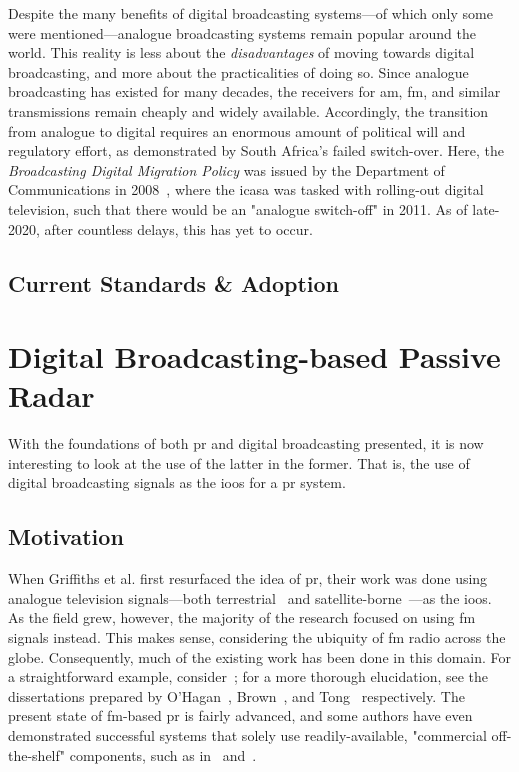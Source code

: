 \documentclass[class=report,11pt,crop=false]{standalone}
\begin{document}
Despite the many benefits of digital broadcasting systems---of which only some were mentioned---analogue broadcasting systems remain popular around the world. This reality is less about the \emph{disadvantages} of moving towards digital broadcasting, and more about the practicalities of doing so. Since analogue broadcasting has existed for many decades, the receivers for \gls{am}, \gls{fm}, and similar transmissions remain cheaply and widely available. Accordingly, the transition from analogue to digital requires an enormous amount of political will and regulatory effort, as demonstrated by South Africa's failed switch-over. Here, the \emph{Broadcasting Digital Migration Policy} was issued by the Department of Communications in 2008~\cite{icasaNotice2008}, where the \gls{icasa} was tasked with rolling-out digital television, such that there would be an "analogue switch-off" in 2011. As of late-2020, after countless delays, this has yet to occur.

\subsection{Current Standards \& Adoption}

\section{Digital Broadcasting-based Passive Radar}
With the foundations of both \gls{pr} and digital broadcasting presented, it is now interesting to look at the use of the latter in the former. That is, the use of digital broadcasting signals as the \gls{ioo}s for a \gls{pr} system.

\subsection{Motivation}
When Griffiths et al. first resurfaced the idea of \gls{pr}, their work was done using analogue television signals---both terrestrial~\cite{Griffiths1986} and satellite-borne~\cite{Griffiths1992}---as the \gls{ioo}s. As the field grew, however, the majority of the research focused on using \gls{fm} signals instead. This makes sense, considering the ubiquity of \gls{fm} radio across the globe. Consequently, much of the existing work has been done in this domain. For a straightforward example, consider~\cite{OHagan2007}; for a more thorough elucidation, see the dissertations prepared by O'Hagan~\cite{o2009passive}, Brown~\cite{brown2013fm}, and Tong~\cite{tong2014} respectively. The present state of \gls{fm}-based \gls{pr} is fairly advanced, and some authors have even demonstrated successful systems that solely use readily-available, "commercial off-the-shelf" components, such as in~\cite{Tong2015} and~\cite{Moser2019}.
\end{document}
